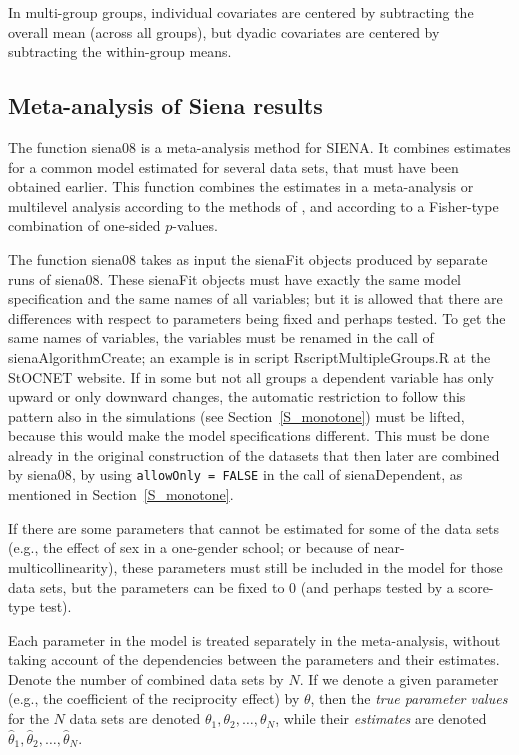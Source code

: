 \documentclass[a4paper,fleqn,11pt]{article}
\newcommand{\+}{\, + \,}
\newcommand{\sfn}[1]{\textsf{#1}}
\newcommand{\SN}{{\sf StOCNET }}
\newcommand{\si}{{\sf SIENA}}
\begin{document}
In multi-group groups, individual covariates are centered by subtracting
the overall mean (across all groups), but dyadic covariates are centered
by subtracting the within-group means.



\subsection{Meta-analysis of Siena results}
\label{S_Siena08}

The function \textsf{siena08} is a meta-analysis method for \si.
It combines estimates for a common model
   estimated for several data sets,
   that must have been obtained earlier.
   This function combines
   the estimates in a meta-analysis or multilevel analysis
   according to the methods of \citet{SnijdersBaerveldt03},
   and according to a Fisher-type combination of one-sided $p$-values.

The function  \textsf{siena08} takes as input the \textsf{sienaFit}
objects produced by separate runs of  \textsf{siena08}.
These \textsf{sienaFit} objects must have exactly the same model
specification and the same names of all variables; but it is allowed
that there are differences with respect to parameters being fixed
and perhaps tested. To get the same names of variables, the
variables must be renamed in the call of \textsf{sienaAlgorithmCreate};
an example is in script \textsf{RscriptMultipleGroups.R} at the \SN website.
If in some but not all groups a dependent variable has only upward or
only downward changes, the automatic restriction to follow this pattern also
in the simulations (see Section~\ref{S_monotone}) must be lifted,
because this would make the model specifications different.
This must be done already in the original construction of the datasets that
then later are combined by \textsf{siena08},
by using \texttt{allowOnly = FALSE} in the call of \sfn{sienaDependent},
as mentioned in Section~\ref{S_monotone}.

If there are some parameters that cannot be estimated for some of the data sets
(e.g., the effect of sex in a one-gender school; or because of
near-multicollinearity), these parameters must still be included
in the model for those data sets, but the parameters can be fixed to 0
(and perhaps tested by a score-type test).
\medskip

Each parameter in the model is treated separately
in the meta-analysis, without taking account of the
dependencies between the parameters and their estimates.
Denote the number of combined data sets by $N$.
If we denote a given parameter (e.g., the
coefficient of the reciprocity effect) by $\theta$,
then the \emph{true parameter values} for the
$N$ data sets are denoted $\theta_1, \theta_2, \ldots, \theta_N$,
while their \emph{estimates} are denoted
 $\hat\theta_1, \hat\theta_2, \ldots, \hat\theta_N$.
 \bigskip
\end{document}
